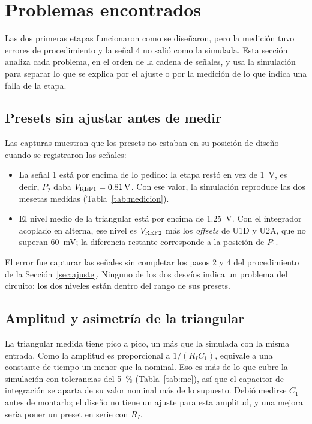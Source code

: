 \section{Problemas encontrados}
\label{sec:problemas}
Las dos primeras etapas funcionaron como se diseñaron, pero la medición tuvo errores de procedimiento y la señal 4 no salió como la simulada. Esta sección analiza cada problema, en el orden de la cadena de señales, y usa la simulación para separar lo que se explica por el ajuste o por la medición de lo que indica una falla de la etapa.

\subsection{Presets sin ajustar antes de medir}
Las capturas muestran que los presets no estaban en su posición de diseño cuando se registraron las señales:
\begin{itemize}[leftmargin=*, nosep]
    \item La señal 1 está  por encima de lo pedido: la etapa restó  en vez de \SI{1}{\volt}, es decir, $P_2$ daba $\Vrefu = \valu{2}{\simAjVrefUno}{\volt}$. Con ese valor, la simulación reproduce las dos mesetas medidas (Tabla~\ref{tab:medicion}).
    \item El nivel medio de la triangular está  por encima de \SI{1,25}{\volt}. Con el integrador acoplado en alterna, ese nivel es $V_{\mathrm{REF2}}$ más los \emph{offsets} de U1D y U2A, que no superan \SI{60}{\milli\volt}; la diferencia restante corresponde a la posición de $P_1$.
\end{itemize}
El error fue capturar las señales sin completar los pasos 2 y 4 del procedimiento de la Sección~\ref{sec:ajuste}. Ninguno de los dos desvíos indica un problema del circuito: los dos niveles están dentro del rango de sus presets.

\subsection{Amplitud y asimetría de la triangular}
La triangular medida tiene  pico a pico, un  más que la simulada con la misma entrada. Como la amplitud es proporcional a $1/(R_I C_1)$, equivale a una constante de tiempo un  menor que la nominal. Eso es más de lo que cubre la simulación con tolerancias del \SI{5}{\percent} (Tabla~\ref{tab:mc}), así que el capacitor de integración se aparta de su valor nominal más de lo supuesto. Debió medirse $C_1$ antes de montarlo; el diseño no tiene un ajuste para esta amplitud, y una mejora sería poner un preset en serie con $R_I$.

